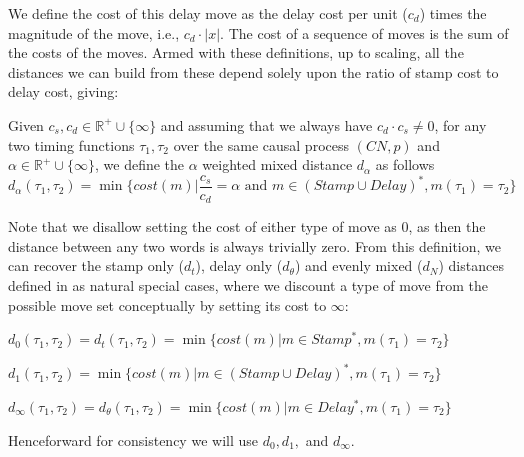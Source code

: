 \documentclass[runningheads]{llncs}
\newcounter{cases}
\begin{document}
    We define the cost of this delay move as the delay cost per unit ($c_d$) times the magnitude of the move, i.e., $c_d \cdot |x|$. 
The cost of a sequence of moves is the sum of the costs of the moves. Armed with these definitions, up to scaling, all the distances we can build from these depend solely upon the ratio of stamp cost to delay cost, giving: 
    \begin{definition}
        Given  $c_s, c_d \in \mathbb{R}^+ \cup \{\infty\}$ and assuming that we always have $c_d \cdot c_s \neq 0$, for any two timing functions $\tau_1, \tau_2$ over the same causal process $(CN, p)$ and $\alpha \in \mathbb{R}^+ \cup \{\infty\}$, we define the $\alpha$ weighted mixed distance $d_{\alpha}$ as follows 
        \small  $$d_{\alpha}(\tau_1, \tau_2) = \min \{cost(m) | \frac{c_s}{c_d} = \alpha \textrm{ and } {m \in (Stamp \cup Delay)^*}, {m(\tau_1) = \tau_2}\}$$
        
    \end{definition}
    \color{firstrevision}Note that we disallow setting the cost of either type of move as 0, as then the distance between any two words is always trivially zero.\color{black}
    From this definition, we can recover the stamp only ($d_t$), delay only ($d_{\theta}$) and evenly mixed ($d_N$) distances defined in \cite{CR22} as natural special cases, where we discount a type of move from the possible move set conceptually by setting its cost to $\infty$:
        
    $d_0(\tau_1, \tau_2) = d_t(\tau_1, \tau_2) = \min \{cost(m) | {m \in Stamp^*}, {m(\tau_1) = \tau_2}\}$

        $d_1(\tau_1, \tau_2) = \min \{cost(m) | {m \in (Stamp \cup Delay)^*}, {m(\tau_1) = \tau_2}\}$

        $d_{\infty}(\tau_1, \tau_2) = d_{\theta}(\tau_1, \tau_2) = \min \{cost(m) | {m \in Delay^*}, {m(\tau_1) = \tau_2}\}$

    Henceforward for consistency we will use $d_0, d_1,$ and $d_{\infty}$. 
    
\end{document}
